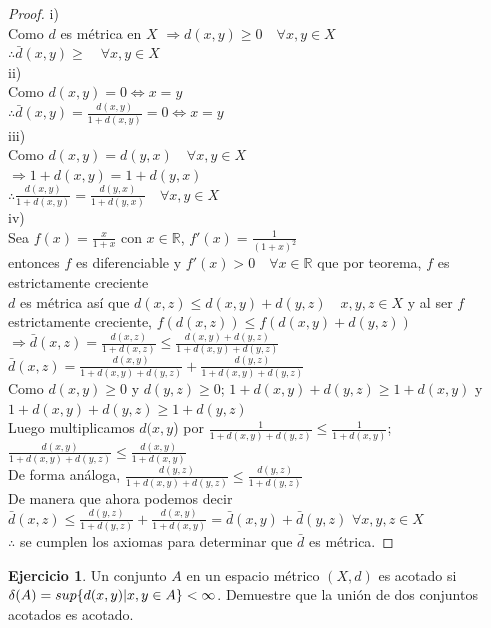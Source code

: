 \documentclass[11pt,a4paper,oneside]{report}
\theoremstyle{definition}
\newtheorem{ejercicio}[definicion]{Ejercicio}
\theoremstyle{plain}
\theoremstyle{remark}
\newcommand{\R}{\mathbb{R}}
\DeclarePairedDelimiter{\conj}{\{}{\}}
\begin{document}
\begin{proof}
  i)\\
  Como $d$ es métrica en $X$ $\Rightarrow d(x,y) \geq 0 \quad \forall x,y \in X$\\
  $\therefore \bar{d}(x,y)\geq \quad \forall x,y \in X$\\
  ii)\\
  Como $d(x,y)=0 \iff x=y$\\
  $\therefore \bar{d}(x,y)=\frac{d(x,y)}{1+d(x,y)}=0 \iff x=y$\\
  iii)\\
  Como $d(x,y)=d(y,x)\quad \forall x,y \in X$\\
  $\Rightarrow 1+ d(x,y)=1+d(y,x)$\\
  $\therefore \frac{d(x,y)}{1+d(x,y)}=\frac{d(y,x)}{1+d(y,x)} \quad \forall x,y \in X$\\
  iv)\\
  Sea $f(x)=\frac{x}{1+x}$ con $x\in\R$, $f'(x)=\frac{1}{(1+x)^2}$\\
  entonces $f$ es diferenciable y $f'(x)>0 \quad \forall x\in \R$ que por teorema,
  $f$ es estrictamente creciente\\
  $d$ es métrica así que $d(x,z)\leq d(x,y)+d(y,z)\quad x,y,z \in X$ y al ser $f$ estrictamente creciente,
  $f(d(x,z))\leq f(d(x,y)+d(y,z))$ $\Rightarrow \bar{d}(x,z)=\frac{d(x,z)}{1+d(x,z)}\leq \frac{d(x,y)+d(y,z)}{1+d(x,y)+d(y,z)}$\\
  $\bar{d}(x,z)=\frac{d(x,y)}{1+d(x,y)+d(y,z)}+\frac{d(y,z)}{1+d(x,y)+d(y,z)}$\\
  Como $d(x,y)\geq 0$ y $d(y,z)\geq0$; $1+d(x,y)+d(y,z)\geq 1 + d(x,y)$ y $1+d(x,y)+d(y,z)\geq 1 + d(y,z)$\\
  Luego multiplicamos $d(x,y$) por $\frac{1}{1+d(x,y)+d(y,z)}\leq \frac{1}{1+d(x,y)}$; 
  $\frac{d(x,y)}{1+d(x,y)+d(y,z)}\leq \frac{d(x,y)}{1+d(x,y)}$\\
  De forma análoga, $\frac{d(y,z)}{1+d(x,y)+d(y,z)}\leq \frac{d(y,z)}{1+d(y,z)}$\\
  De manera que ahora podemos decir $\bar{d}(x,z)\leq \frac{d(y,z)}{1+d(y,z)} + \frac{d(x,y)}{1+d(x,y)}=\bar{d}(x,y)+\bar{d}(y,z)$ 
  $\forall x,y,z \in X$\\
  $\therefore$ se cumplen los axiomas para determinar que $\bar{d}$ es métrica.
\end{proof}

\begin{ejercicio}
  Un conjunto $A$ en un espacio métrico $(X,d)$ es acotado si 
  $\delta(A)=sup\conj{d(x,y)|x,y\in A}<\infty$. Demuestre que la unión de dos 
  conjuntos acotados es acotado.
\end{ejercicio}
\end{document}
